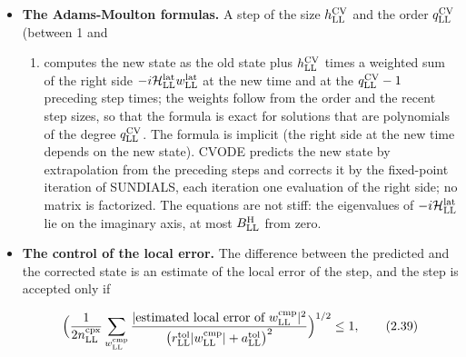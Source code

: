 \documentclass[
  10pt,
]{article}
\providecommand{\tightlist}{%
  \setlength{\itemsep}{0pt}\setlength{\parskip}{0pt}}
\begin{document}
\begin{itemize}
\item
  \textbf{The Adams-Moulton formulas.} A step of the size
  \(h^{\rm CV}_{\rm LL}\) and the order \(q^{\rm CV}_{\rm LL}\) (between
  1 and

  \begin{enumerate}
  \def\labelenumi{\arabic{enumi})}
  \setcounter{enumi}{11}
  \tightlist
  \item
    computes the new state as the old state plus \(h^{\rm CV}_{\rm LL}\)
    times a weighted sum of the right side
    \(-i\mathcal H^{\rm lat}_{\rm LL}w^{\rm lat}_{\rm LL}\) at the new
    time and at the \(q^{\rm CV}_{\rm LL}-1\) preceding step times; the
    weights follow from the order and the recent step sizes, so that the
    formula is exact for solutions that are polynomials of the degree
    \(q^{\rm CV}_{\rm LL}\). The formula is implicit (the right side at
    the new time depends on the new state). CVODE predicts the new state
    by extrapolation from the preceding steps and corrects it by the
    fixed-point iteration of SUNDIALS, each iteration one evaluation of
    the right side; no matrix is factorized. The equations are not
    stiff: the eigenvalues of \(-i\mathcal H^{\rm lat}_{\rm LL}\) lie on
    the imaginary axis, at most \(B^{\rm H}_{\rm LL}\) from zero.
  \end{enumerate}
\item
  \textbf{The control of the local error.} The difference between the
  predicted and the corrected state is an estimate of the local error of
  the step, and the step is accepted only if

  \[\Big(\frac{1}{2n^{\rm cpx}_{\rm LL}}\sum_{w^{\rm cmp}_{\rm LL}}\frac{\lvert\text{estimated local error of }w^{\rm cmp}_{\rm LL}\rvert^2}{\big(r^{\rm tol}_{\rm LL}\lvert w^{\rm cmp}_{\rm LL}\rvert+a^{\rm tol}_{\rm LL}\big)^2}\Big)^{1/2}\le1,\tag{2.39}\]


\end{itemize}
\end{document}
